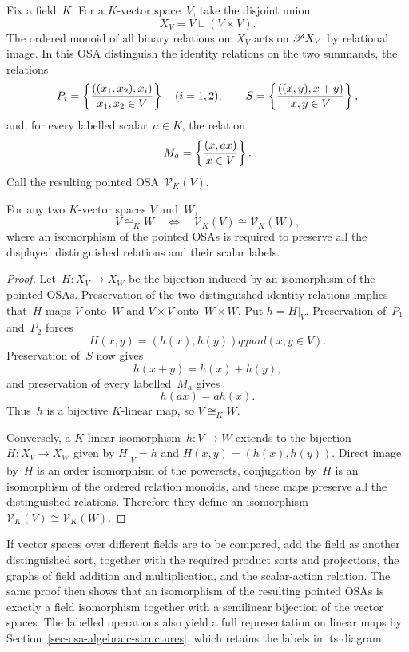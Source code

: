 Fix a field~$K$.  For a $K$-vector space~$V$, take the disjoint union
\[
 X_V=V\sqcup(V\times V).
\]
The ordered monoid of all binary relations on~$X_V$ acts on
$\mathscr{P} X_V$ by relational image.  In this OSA distinguish the identity
relations on the two summands, the relations
\[
 P_i=\left\{ \frac{((x_1,x_2),x_i)}{x_1,x_2\in V}\right\}\quad(i=1,2),
 \qquad
 S=\left\{ \frac{((x,y),x+y)}{x,y\in V}\right\},
\]
and, for every labelled scalar~$a\in K$, the relation
\[
 M_a=\left\{ \frac{(x,ax)}{x\in V}\right\}.
\]
Call the resulting pointed OSA~$\mathcal V_K(V)$.

\begin{prop}
For any two $K$-vector spaces $V$ and~$W$,
\[
 V\cong_K W\quad\Longleftrightarrow\quad
 \mathcal V_K(V)\cong\mathcal V_K(W),
\]
where an isomorphism of the pointed OSAs is required to preserve all the
displayed distinguished relations and their scalar labels.
\end{prop}

\begin{proof}
Let~$H:X_V\to X_W$ be the bijection induced by an isomorphism of the
pointed OSAs.  Preservation of the two distinguished identity relations
implies that~$H$ maps $V$ onto~$W$ and $V\times V$ onto~$W\times W$.  Put
$h=H|_V$.  Preservation of~$P_1$ and~$P_2$ forces
\[
 H(x,y)=(h(x),h(y))qquad(x,y\in V).
\]
Preservation of~$S$ now gives
\[
 h(x+y)=h(x)+h(y),
\]
and preservation of every labelled~$M_a$ gives
\[
 h(ax)=a h(x).
\]
Thus~$h$ is a bijective $K$-linear map, so $V\cong_K W$.

Conversely, a $K$-linear isomorphism~$h:V\to W$ extends to the bijection
$H:X_V\to X_W$ given by $H|_V=h$ and
$H(x,y)=(h(x),h(y))$.  Direct image by~$H$ is an order isomorphism of the
powersets, conjugation by~$H$ is an isomorphism of the ordered relation
monoids, and these maps preserve all the distinguished relations.
Therefore they define an isomorphism
$\mathcal V_K(V)\cong\mathcal V_K(W)$.
\end{proof}

If vector spaces over different fields are to be compared, add the field
as another distinguished sort, together with the required product sorts
and projections, the graphs of field addition and multiplication, and the
scalar-action relation.  The same proof then shows that an isomorphism of
the resulting pointed OSAs is exactly a field isomorphism together with a
semilinear bijection of the vector spaces.
The labelled operations also yield a full representation on linear maps
by Section~\ref{sec-osa-algebraic-structures}, which retains the labels
in its diagram.

